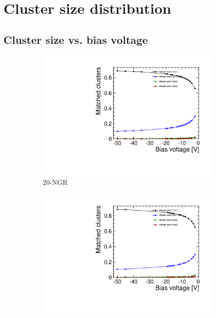 \section{Cluster size distribution}
\subsection{Cluster size vs. bias voltage}
\begin{figure}[htbp] \centering
  \begin{subfigure}[b]{0.33\textwidth}
    \includegraphics[width=\textwidth]{./figures/TestBeam/cluSize_bias_W0019_G07.pdf}
    \caption{20-NGR}
  \end{subfigure} \hfill
  \begin{subfigure}[b]{0.33\textwidth}
    \includegraphics[width=\textwidth]{./figures/TestBeam/cluSize_bias_W0019_F07.pdf}

\end{subfigure}
\end{figure}

